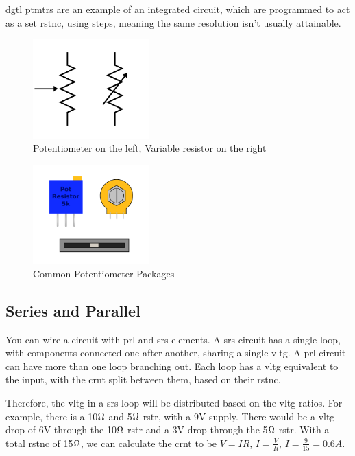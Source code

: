 \documentclass[a4paper,11pt]{report}
\begin{document}
\gls{dgtl} \gls{ptmtr}s are an example of an integrated circuit, which are programmed to act as a set \gls{rstnc}, using steps, meaning the same resolution isn't usually attainable.

\begin{figure}[H]
\centering
\includegraphics[width=0.4\textwidth]{Potentiometer1}
\caption{Potentiometer on the left, Variable resistor on the right}
\end{figure}

\begin{figure}[H]
\centering
\includegraphics[width=0.4\textwidth]{PotentiometerPackages}
\caption{Common Potentiometer Packages}
\end{figure}

\vspace*{1\baselineskip}

\subsection{Series and Parallel}

You can wire a circuit with \gls{prl} and \gls{srs} elements. A \gls{srs} circuit has a single loop, with components connected one after another, sharing a single \gls{vltg}. A \gls{prl} circuit can have more than one loop branching out. Each loop has a \gls{vltg} equivalent to the input, with the \gls{crnt} split between them, based on their \gls{rstnc}.

Therefore, the \gls{vltg} in a \gls{srs} loop will be distributed based on the \gls{vltg} ratios. For example, there is a 10$\ohm$ and 5$\ohm$ \gls{rstr}, with a 9V supply. There would be a \gls{vltg} drop of 6V through the 10$\ohm$ \gls{rstr} and a 3V drop through the 5$\ohm$ \gls{rstr}. With a total \gls{rstnc} of 15$\ohm$, we can calculate the \gls{crnt} to be $V=IR$, $I=\frac{V}{R}$, $I=\frac{9}{15}=0.6A$.
\end{document}
